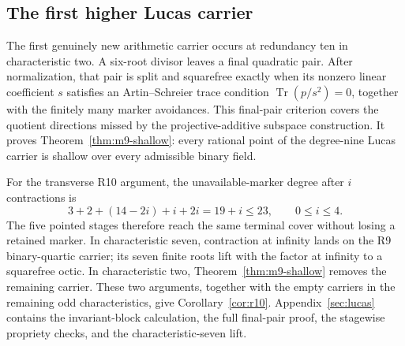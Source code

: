\subsection{The first higher Lucas carrier}

The first genuinely new arithmetic carrier occurs at redundancy ten in
characteristic two.  A six-root divisor leaves a final quadratic pair.  After
normalization, that pair is split and squarefree exactly when its nonzero
linear coefficient $s$ satisfies an Artin--Schreier trace condition
\(\operatorname{Tr}(p/s^2)=0\), together with the finitely many marker
avoidances.  This final-pair criterion covers the quotient directions missed
by the projective-additive subspace construction.  It proves
Theorem~\ref{thm:m9-shallow}: every rational point of the degree-nine Lucas
carrier is shallow over every admissible binary field.

For the transverse R10 argument, the unavailable-marker degree after $i$
contractions is
\[
                 3+2+(14-2i)+i+2i=19+i\leq23,
                 \qquad 0\leq i\leq4.
\]
The five pointed stages therefore reach the same terminal cover without
losing a retained marker.  In characteristic seven, contraction at infinity
lands on the R9 binary-quartic carrier; its seven finite roots lift with the
factor at infinity to a squarefree octic.  In characteristic two,
Theorem~\ref{thm:m9-shallow} removes the remaining carrier.  These two
arguments, together with the empty carriers in the remaining odd
characteristics, give Corollary~\ref{cor:r10}.
Appendix~\ref{sec:lucas} contains the invariant-block
calculation, the full final-pair proof, the stagewise propriety checks, and the
characteristic-seven lift.
